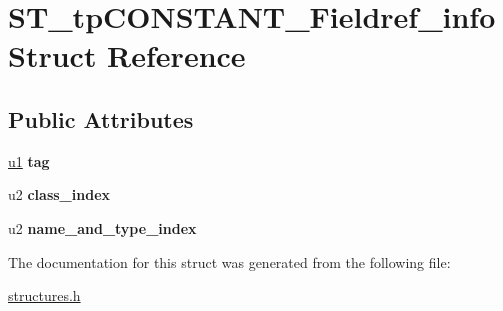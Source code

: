 \hypertarget{structST__tpCONSTANT__Fieldref__info}{}\section{S\+T\+\_\+tp\+C\+O\+N\+S\+T\+A\+N\+T\+\_\+\+Fieldref\+\_\+info Struct Reference}
\label{structST__tpCONSTANT__Fieldref__info}
\subsection*{Public Attributes}
\begin{DoxyCompactItemize}
\item 
\mbox{\label{structST__tpCONSTANT__Fieldref__info_aed228d17dd27465592a8a7e5a97da41a}} 
\mbox{\hyperlink{structures_8h_ad9f4cdb6757615aae2fad89dab3c5470}{u1}} {\bfseries tag}
\item 
\mbox{\label{structST__tpCONSTANT__Fieldref__info_ab3238bf16a760ebd9e6ab2a262a4f4e7}} 
u2 {\bfseries class\+\_\+index}
\item 
\mbox{\label{structST__tpCONSTANT__Fieldref__info_a55345903463630d8703412787e44a647}} 
u2 {\bfseries name\+\_\+and\+\_\+type\+\_\+index}
\end{DoxyCompactItemize}


The documentation for this struct was generated from the following file\+:\begin{DoxyCompactItemize}
\item 
\mbox{\hyperlink{structures_8h}{structures.\+h}}\end{DoxyCompactItemize}
